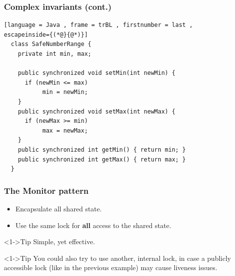 \documentclass[xcolor={dvipsnames,svgnames},aspectratio=169]{beamer}
\begin{document}
\begin{frame}[fragile]
  \frametitle{Complex invariants (cont.)}

\begin{lstlisting}[language = Java , frame = trBL , firstnumber = last ,
escapeinside={(*@}{@*)}]
  class SafeNumberRange {
    private int min, max;

    public synchronized void setMin(int newMin) {
      if (newMin <= max)
           min = newMin;
    }
    public synchronized void setMax(int newMax) {
      if (newMax >= min)
           max = newMax;
    }
    public synchronized int getMin() { return min; }
    public synchronized int getMax() { return max; }
  }
\end{lstlisting}
\end{frame}

\begin{frame}[fragile]
  \frametitle{The Monitor pattern}

  \begin{itemize}
  \item[\faBook]<1-> Encapsulate all shared state.
  \item[\faBook]<1-> Use the same lock for \textbf{all} access to the shared state.
  \end{itemize}
  \vspace{0.2cm}
  \begin{block}<1->{\faLightbulb\quad Tip}
    Simple, yet effective.
  \end{block}
  \pause
  \begin{block}<1->{\faLightbulb\quad Tip}
      You could also try to use another, internal lock, in case a publicly
      accessible lock (like in the previous example) may cause liveness issues.
  \end{block}
\end{frame}
\end{document}
